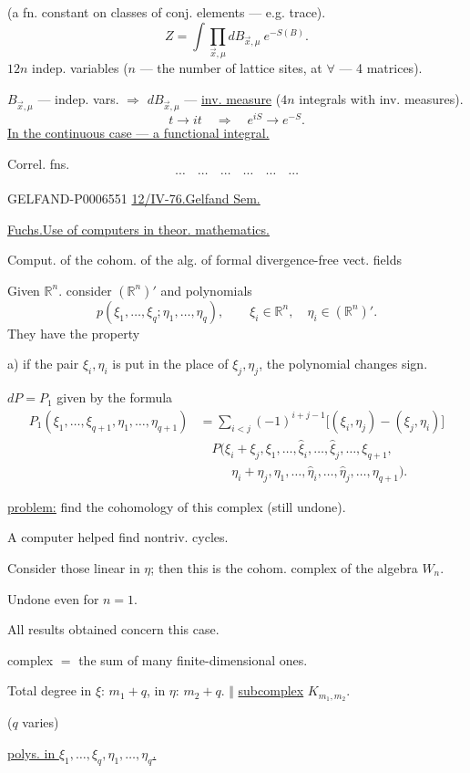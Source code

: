 (a fn. constant on classes of conj. elements --- e.g. trace).
\[
Z=\int\prod_{\vec x,\mu}dB_{\vec x,\mu}\ e^{-S(B)}.
\]
\(12n\) indep. variables (\(n\) --- the number of lattice sites, at \(\forall\) --- 4 matrices).

\(B_{\vec x,\mu}\) --- indep. vars. \(\Longrightarrow\)
\(dB_{\vec x,\mu}\) --- \underline{inv. measure}
(\(4n\) integrals with inv. measures).
\[
t\to it\quad\Longrightarrow\quad e^{iS}\to e^{-S}.
\]
\underline{In the continuous case --- a functional integral.}

Correl. fns.
\[
\cdots\quad\cdots\quad\cdots\quad\cdots\quad\cdots\quad\cdots
\]


\begin{GelfandAdjacentEvidence}{GELFAND-P000655}{1}
\underline{12/IV-76.}\quad \underline{Gelfand Sem.}

\underline{\underline{Fuchs.}}\quad \underline{Use of computers in theor. mathematics.}

Comput. of the cohom. of the alg. of formal divergence-free vect. fields

Given \(\mathbb R^n\). consider \((\mathbb R^n)'\) and polynomials
\[
p(\xi_1,\ldots,\xi_q;\eta_1,\ldots,\eta_q),\qquad
\xi_i\in\mathbb R^n,\quad\eta_i\in(\mathbb R^n)'.
\]
They have the property

a) if the pair \(\xi_i,\eta_i\) is put in the place of \(\xi_j,\eta_j\), the polynomial changes sign.

\(dP=P_1\) given by the formula
\begin{align*}
P_1(\xi_1,\ldots,\xi_{q+1},\eta_1,\ldots,\eta_{q+1})
 &=\sum_{i<j}(-1)^{i+j-1}\big[(\xi_i,\eta_j)-(\xi_j,\eta_i)\big]\\
 &\quad P(\xi_i+\xi_j,\xi_1,\ldots,\widehat\xi_i,\ldots,
                \widehat\xi_j,\ldots,\xi_{q+1},\\
 &\qquad\;\;\eta_i+\eta_j,\eta_1,\ldots,\widehat\eta_i,\ldots,
                 \widehat\eta_j,\ldots,\eta_{q+1}).
\end{align*}

\underline{\underline{problem:}} find the cohomology of this complex (still undone).

A computer helped find nontriv. cycles.

Consider those linear in \(\eta\); then this is the cohom. complex of the algebra \(W_n\).

Undone even for \(n=1\).

All results obtained concern this case.

complex \(=\) the sum of many finite-dimensional ones.

Total degree in \(\xi\): \(m_1+q\),
\quad in \(\eta\): \(m_2+q\).
\quad [At right] \(\Vert\) \underline{subcomplex} \(K_{m_1,m_2}\).

(\(q\) varies)

\underline{polys. in \(\xi_1,\ldots,\xi_q,\eta_1,\ldots,\eta_q\).}
\end{GelfandAdjacentEvidence}
